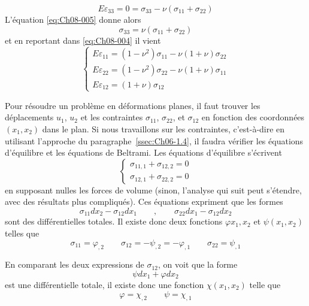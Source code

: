 \begin{equation}
     E\varepsilon_{33} = 0 = \sigma_{33}-\nu(\sigma_{11}+\sigma_{22})
    \label{eq:Ch08-005}
\end{equation}
L'équation \eqref{eq:Ch08-005} donne alors
\begin{equation}
    \sigma_{33}=\nu(\sigma_{11}+\sigma_{22})
    \label{eq:Ch08-006}
\end{equation}
et en reportant dans \eqref{eq:Ch08-004} il vient 
\begin{equation}
   \begin{cases}
     E\varepsilon_{11} = (1-\nu^2)\sigma_{11} - \nu(1+\nu)\sigma_{22}\\
     E\varepsilon_{22} = (1-\nu^2)\sigma_{22} - \nu(1+\nu)\sigma_{11}\\
     E\varepsilon_{12} = (1+\nu)\sigma_{12}
   \end{cases}
    \label{eq:Ch08-007}
\end{equation}

Pour résoudre un problème en déformations planes, il faut trouver les déplacements $u_1$, $u_2$ et les contraintes $\sigma_{11}$, $\sigma_{22}$, et $\sigma_{12}$ en fonction des coordonnées $(x_1,x_2)$ dans le plan.
Si nous travaillons sur les contraintes, c'est-à-dire en utilisant l'approche du paragraphe~\ref{ssec:Ch06-1.4}, il faudra vérifier les équations d'équilibre et les équations de Beltrami. 
Les équations d'équilibre s'écrivent 
\begin{equation}
   \begin{cases}
     \sigma_{11,1}+\sigma_{12,2}=0\\
     \sigma_{12,1}+\sigma_{22,2}=0
   \end{cases}
    \label{eq:Ch08-008}
\end{equation}
en supposant nulles les forces de volume (sinon, l'analyse qui suit peut s'étendre, avec des résultats plus compliqués). 
Ces équations expriment que les formes 
\begin{equation*}
\sigma_{11}dx_2-\sigma_{12}dx_1 \qquad,\qquad \sigma_{22}dx_1-\sigma_{12}dx_2
\end{equation*}
sont des différentielles totales. Il existe donc deux fonctions   $\varphi{x_1,x_2}$ et $\psi(x_1,x_2)$ telles que 
\begin{equation*}
\sigma_{11}=\varphi_{,2} \qquad \sigma_{12}=-\psi_{,2}=-\varphi_{,1} \qquad \sigma_{22}=\psi_{,1}
\end{equation*}

En comparant les deux expressions de $\sigma_{12}$, on voit que la forme 
\begin{equation*}
\psi dx_1 + \varphi dx_2
\end{equation*}
est une différentielle totale, il existe donc une fonction $\chi(x_1,x_2)$ telle que 
\begin{equation*}
\varphi=\chi_{,2} \qquad \psi=\chi_{,1}
\end{equation*}

